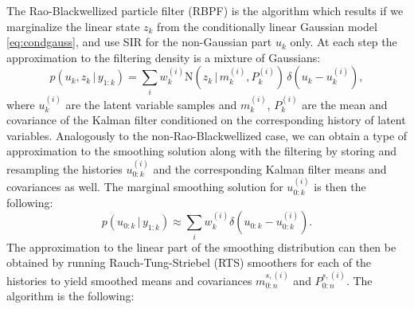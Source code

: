 \documentclass[twocolumn]{autart}    %
\begin{document}
The Rao-Blackwellized particle filter (RBPF)
\cite{Doucet+Godsill+Andrieu:2000,Chen+Liu:2000} is the algorithm
which results if we marginalize the linear state $z_k$ from the
conditionally linear Gaussian model \eqref{eq:condgauss}, and use SIR
for the non-Gaussian part $u_k$ only. At each step the approximation
to the filtering density is a mixture of Gaussians:
%
\begin{equation}
    p(u_k,z_k\,|\,y_{1:k})
    = \sum_i w_k^{(i)}
  \mathrm{N}(z_k\,|\,m_k^{(i)},P_k^{(i)}) \, \delta(u_k - u_k^{(i)}),
\nonumber
\end{equation}
%
where $u_k^{(i)}$ are the latent variable samples and $m_k^{(i)}$,
$P_k^{(i)}$ are the mean and covariance of the Kalman filter
conditioned on the corresponding history of latent
variables. Analogously to the non-Rao-Blackwellized case, we can
obtain a \cite{Kitagawa:1996} type of approximation to the smoothing
solution along with the filtering by storing and resampling the
histories $u^{(i)}_{0:k}$ and the corresponding Kalman filter means
and covariances as well. The marginal smoothing solution for
$u^{(i)}_{0:k}$ is then the following:
%
\begin{equation}
  p(u_{0:k}\,|\,y_{1:k}) \approx
  \sum_i w_k^{(i)} \delta(u_{0:k} - u_{0:k}^{(i)}).
\label{eq:rbpf_usmooth}
\end{equation}
%
The approximation to the linear part of the smoothing distribution can
then be obtained by running Rauch-Tung-Striebel (RTS) smoothers for
each of the histories to yield smoothed means and covariances
$m^{s,(i)}_{0:n}$ and $P^{s,(i)}_{0:n}$. The algorithm is the
following:
%
\end{document}
